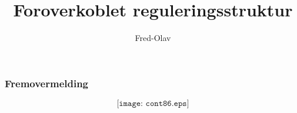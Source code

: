 \documentclass{beamer}
\title{Foroverkoblet reguleringsstruktur}
\author{Fred-Olav}
\begin{document}
\maketitle

%
\begin{frame}
	\frametitle{Fremovermelding}

	
$$\texttt{[image: cont86.eps]}$$

\end{frame}
\end{document}
